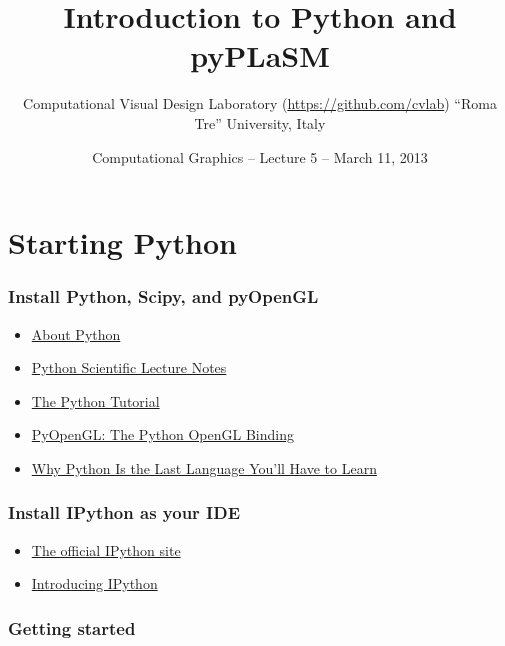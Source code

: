 \documentclass[ignorenonframetext,]{beamer}
\title{Introduction to Python and pyPLaSM}
\author{Computational Visual Design Laboratory (\url{https://github.com/cvlab})
                ``Roma Tre'' University, Italy}
\date{Computational Graphics -- Lecture 5 -- March 11, 2013}
\def\emph#1{{\color{cyan}#1}}
\begin{document}
\frame{\titlepage}

\begin{frame}

\tableofcontents

\end{frame}

\section{Starting Python}

\begin{frame}\frametitle{Install Python, Scipy, and pyOpenGL}

\begin{itemize}
\item
  \href{http://python.org/about/}{\emph{About Python}}
\item
  \href{http://scipy-lectures.github.com/}{\emph{Python Scientific
  Lecture Notes}}
\item
  \href{http://docs.python.org/2/tutorial/}{\emph{The Python Tutorial}}
\item
  \href{http://pyopengl.sourceforge.net/}{\emph{PyOpenGL: The Python
  OpenGL Binding}}
\item
  \href{http://jakevdp.github.com/blog/2012/09/20/why-python-is-the-last/}{\emph{Why
  Python Is the Last Language You'll Have to Learn}}
\end{itemize}

\end{frame}

\begin{frame}\frametitle{Install IPython as your IDE}

\begin{itemize}
\itemsep1pt\parskip0pt
\item
  \href{http://ipython.org/}{\emph{The official IPython site}}
\end{itemize}

\vfill

\begin{itemize}
\itemsep1pt\parskip0pt
\item
  \href{http://ipython.org/ipython-doc/stable/interactive/tutorial.html}{\emph{Introducing
  IPython}}
\end{itemize}

\end{frame}

\begin{frame}[fragile]\frametitle{Getting started}


\end{frame}
\end{document}
